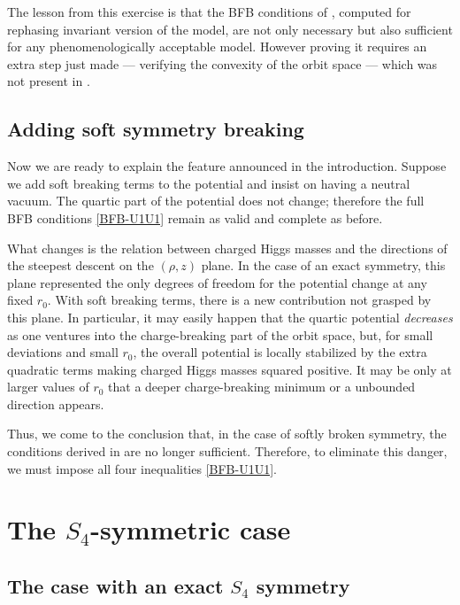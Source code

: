 \documentclass[11pt]{article}
\begin{document}
The lesson from this exercise is that the BFB conditions of \cite{Dekens:2011,Pramanick:2017wry},
computed for rephasing invariant version of the model, are not only necessary but also sufficient for any phenomenologically acceptable model.
However proving it requires an extra step just made --- verifying the convexity of the orbit space --- 
which was not present in \cite{Dekens:2011,Pramanick:2017wry}.

\subsection{Adding soft symmetry breaking}

Now we are ready to explain the feature announced in the introduction.
Suppose we add soft breaking terms to the potential and insist on having a neutral vacuum.
The quartic part of the potential does not change; therefore the full BFB conditions \eqref{BFB-U1U1}
remain as valid and complete as before.

What changes is the relation between charged Higgs masses and the directions of the steepest descent on the $(\rho,z)$ plane.
In the case of an exact symmetry, this plane represented the only degrees of freedom for the potential change
at any fixed $r_0$. 
With soft breaking terms, there is a new contribution not grasped by this plane.
In particular, it may easily happen that the quartic potential {\em decreases} 
as one ventures into the charge-breaking part of the orbit space, but, for small deviations and small $r_0$,
the overall potential is locally stabilized by the extra quadratic terms making charged Higgs masses squared positive.
It may be only at larger values of $r_0$ that a deeper charge-breaking minimum or a unbounded direction appears.

Thus, we come to the conclusion that, in the case of softly broken symmetry, the conditions derived in 
\cite{Dekens:2011,Pramanick:2017wry} are no longer sufficient. 
Therefore, to eliminate this danger, we must impose all four inequalities \eqref{BFB-U1U1}.

\section{The $S_4$-symmetric case} \label{section-S4}

\subsection{The case with an exact $S_4$ symmetry}
\end{document}
